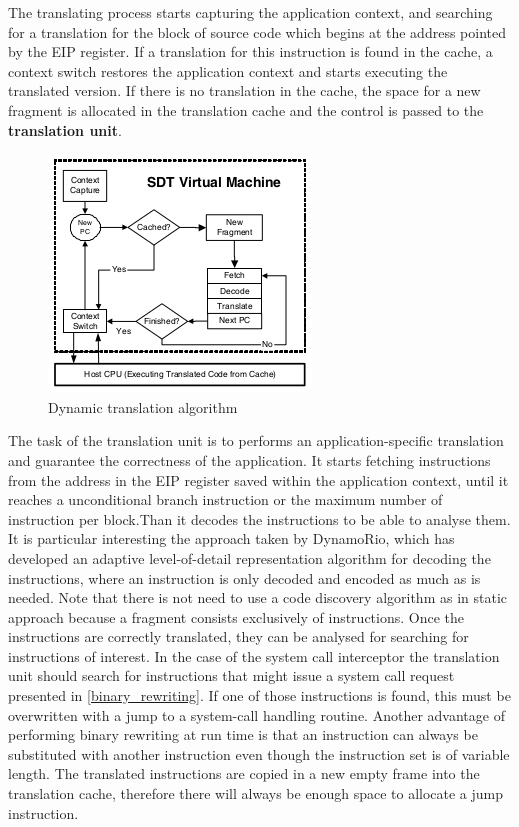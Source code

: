 The translating process starts capturing the application context, and searching for a translation for the block of source code which begins at the address pointed by the EIP register. If a translation for this instruction is found in the cache, a context switch restores the application context and starts executing the translated version.  If there is no translation in the cache, the space for a new fragment is allocated in the translation cache and the control is passed to the \textbf{translation unit}.

\begin{figure}[t]
\centering
\includegraphics[scale=1]{Chapter3/Chapter3Figs/dynamic_algorithm.png} 
\caption{Dynamic translation algorithm}
\label{fig:dynamic translation algorithm}
\end{figure}

The task of the translation unit is to performs an application-specific translation and guarantee the correctness of the application. It starts fetching instructions from the address in the EIP register saved within the application context, until it reaches a  unconditional branch instruction or the maximum number of instruction per block.Than it decodes the instructions to be able to analyse them. It is particular interesting the approach taken by DynamoRio, which has developed an adaptive level-of-detail representation algorithm for decoding the instructions, where an instruction is only decoded and encoded as much as is needed. Note that there is not need to use a code discovery algorithm as in static approach because a fragment consists exclusively of instructions. Once the instructions are correctly translated,  they can be analysed for searching for instructions of interest. In the case of the system call interceptor the translation unit should search for instructions that might issue a system call request presented in \ref{binary_rewriting}. If one of those instructions is found, this must be overwritten with a jump to a system-call handling routine. Another advantage of performing binary rewriting at run time is that an instruction can always be substituted with another instruction even though the instruction set is of variable length. The translated instructions are copied in a new empty frame into the translation cache, therefore  there will always be enough space to allocate a jump instruction.   

